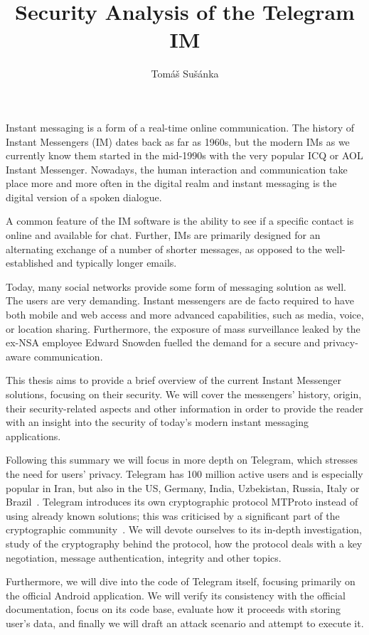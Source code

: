 \documentclass[thesis=M,english]{FITthesis}[2012/10/20]
\title{Security Analysis of the Telegram IM}
\author{Tom{\' a}{\v s} Su{\v s}{\' a}nka} %
\begin{document}
\begin{introduction}

Instant messaging is a form of a real-time online communication. The history of Instant Messengers (IM) dates back as far as 1960s, but the modern IMs as we currently know them started in the mid-1990s with the very popular ICQ or AOL Instant Messenger. Nowadays, the human interaction and communication take place more and more often in the digital realm and instant messaging is the digital version of a spoken dialogue.

A common feature of the IM software is the ability to see if a specific contact is online and available for chat. Further, IMs are primarily designed for an alternating exchange of a number of shorter messages, as opposed to the well-established and typically longer emails.

Today, many social networks provide some form of messaging solution as well. The users are very demanding. Instant messengers are de facto required to have both mobile and web access and more advanced capabilities, such as media, voice, or location sharing. Furthermore, the exposure of mass surveillance leaked by the ex-NSA employee Edward Snowden fuelled the demand for a secure and privacy-aware communication.

This thesis aims to provide a brief overview of the current Instant Messenger solutions, focusing on their security. We will cover the messengers' history, origin, their security-related aspects and other information in order to provide the reader with an insight into the security of today's modern instant messaging applications.

Following this summary we will focus in more depth on Telegram, which stresses the need for users' privacy. Telegram has 100 million active users and is especially popular in Iran, but also in the US, Germany, India, Uzbekistan, Russia, Italy or Brazil~\cite{telegram-countries}. Telegram introduces its own cryptographic protocol MTProto instead of using already known solutions; this was criticised by a significant part of the cryptographic community~\cite{telegram-community-vice,telegram-community-register}. We will devote ourselves to its in-depth investigation, study of the cryptography behind the protocol, how the protocol deals with a key negotiation, message authentication, integrity and other topics.

Furthermore, we will dive into the code of Telegram itself, focusing primarily on the official Android application. We will verify its consistency with the official documentation, focus on its code base, evaluate how it proceeds with storing user's data, and finally we will draft an attack scenario and attempt to execute it.

\end{introduction}
\end{document}
